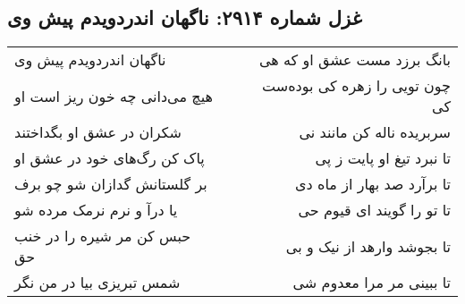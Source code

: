 \begin{center}
\section*{غزل شماره ۲۹۱۴: ناگهان اندردویدم پیش وی}
\label{sec:2914}
\begin{longtable}{l p{0.5cm} r}
ناگهان اندردویدم پیش وی
&&
بانگ برزد مست عشق او که هی
\\
هیچ می‌دانی چه خون ریز است او
&&
چون تویی را زهره کی بوده‌ست کی
\\
شکران در عشق او بگداختند
&&
سربریده ناله کن مانند نی
\\
پاک کن رگ‌های خود در عشق او
&&
تا نبرد تیغ او پایت ز پی
\\
بر گلستانش گدازان شو چو برف
&&
تا برآرد صد بهار از ماه دی
\\
یا درآ و نرم نرمک مرده شو
&&
تا تو را گویند ای قیوم حی
\\
حبس کن مر شیره را در خنب حق
&&
تا بجوشد وارهد از نیک و بی
\\
شمس تبریزی بیا در من نگر
&&
تا ببینی مر مرا معدوم شی
\\
\end{longtable}
\end{center}
